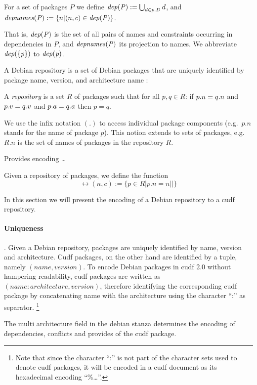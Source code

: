 \begin{definition}
  For a set of packages $P$ we define
  \(\mathit{dep(P)} := \bigcup_{d\in p.D} d\), and\linebreak
  \(\mathit{depnames(P)} := \{ n | (n,c) \in\mathit{dep(P)}\}\).
\end{definition}
That is, $\mathit{dep(P)}$ is the set of all pairs of names and
constraints occurring in dependencies in $P$, and $\mathit{depnames(P)}$ its
projection to names. We abbreviate $\mathit{dep(\{p\})}$ to $\mathit{dep(p)}$.

A Debian repository is a set of Debian packages that are uniquely
identified by package name, version, and architecture name :
\begin{definition}
  \label{def:repository}
  A \emph{repository} is a set $R$ of packages such that for all $p, q
  \in R$: if $p.n=q.n$ and $p.v=q.v$ and 
  $p.a=q.a$ then $p=q$.
\end{definition}

We use the infix notation $(.)$ to access individual package
components (e.g.~$p.n$ stands for the name of package $p$). This
notion extends to sets of packages, e.g.~$R.n$ is the set of names of
packages in the repository $R$.

Provides encoding \ldots
\begin{definition}
  Given a repository of packages, we define the function 
  \[
    \rel{(n,c)} := \{ p \in R | p.n = n || \}
  \]
\end{definition}

In this section we will present the encoding of a Debian repository to
a cudf repository.

\paragraph{Uniqueness}.
Given a Debian repository, packages are uniquely identified by name,
version and architecture. Cudf packages, on the other hand are
identified by a tuple, namely $(name,version)$. To encode Debian
packages in cudf 2.0 without hampering readability, cudf packages are
written as $(name:architecture, version)$, therefore identifying the
corresponding cudf package by concatenating name with the architecture
using the character ``:'' as separator. \footnote{Note that since the
  character ``:'' is not part of the character sets used to denote
cudf packages, it will be encoded in a cudf document as its
hexadecimal encoding ``\%\ldots''.}

The multi architecture field in the debian stanza determines the
encoding of dependencies, conflicts and provides of the cudf package.

